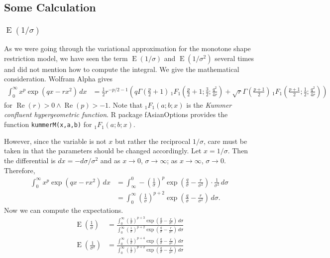 \documentclass[11pt]{article}
\newcommand{\opn}{\operatorname}
\begin{document}
\subsection{Some Calculation}
\subsubsection{$\opn{E}\left(1/\sigma\right)$}
As we were going through the variational approximation for the monotone shape restriction model, we have seen the term $\opn{E}\left(1/\sigma\right)$ and $\opn{E}\left(1/\sigma^{2}\right)$ several times and did not mention how to compute the integral. We give the mathematical consideration. Wolfram Alpha gives
\begin{align*}
  \int_{0}^{\infty}x^{p}\exp\left(qx-rx^{2}\right)\,dx &= \frac{1}{2}r^{-p/2 -1}\left(q\Gamma\left(\frac{p}{2}+1\right)\, _{1}{F}_{1}\left(\frac{p}{2}+1;\frac{3}{2};\frac{q^{2}}{4r}\right)+\sqrt{r}\Gamma\left(\frac{p+1}{2}\right)\, _{1}{F}_{1}\left(\frac{p+1}{2};\frac{1}{2};\frac{q^{2}}{4r}\right)\right)
\end{align*}
for $\opn{Re}\left(r\right)>0 \wedge \opn{Re}\left(p\right) > -1$. Note that $_{1}F_{1}\left(a;b;x\right)$ is the \emph{Kummer confluent hypergeometric function}. \textsf{R} package \textsf{fAsianOptions} provides the function \texttt{kummerM(x,a,b)} for $_{1}F_{1}\left(a;b;x\right)$. \par
However, since the variable is not $x$ but rather the reciprocal $1/\sigma$, care must be taken in that the parameters should be changed accordingly. Let $x=1/\sigma$. Then the differential is $dx = -d\sigma/\sigma^{2}$ and as $x\to 0$, $\sigma \to \infty$; as $x \to \infty$, $\sigma \to 0$. Therefore,
\begin{align*}
  \int_{0}^{\infty}x^{p}\exp\left(qx-rx^{2}\right)\,dx &= \int_{\infty}^{0} -\left(\frac{1}{\sigma}\right)^{p}\exp\left(\frac{q}{\sigma}-\frac{r}{\sigma^{2}}\right)\cdot \frac{1}{\sigma^{2}}\,d\sigma\\
  &= \int_{0}^{\infty} \left(\frac{1}{\sigma}\right)^{p+2}\exp\left(\frac{q}{\sigma}-\frac{r}{\sigma^{2}}\right)\,d\sigma.
\end{align*}
Now we can compute the expectations.
\begin{align*}
  \opn{E}\left(\frac{1}{\sigma}\right) &= \frac{\int_{0}^{\infty}\left(\frac{1}{\sigma}\right)^{p+3}\exp\left(\frac{q}{\sigma}-\frac{r}{\sigma^{2}}\right)\,d\sigma}{\int_{0}^{\infty} \left(\frac{1}{\sigma}\right)^{p+2}\exp\left(\frac{q}{\sigma}-\frac{r}{\sigma^{2}}\right)\,d\sigma}\\
  \opn{E}\left(\frac{1}{\sigma^{2}}\right) &= \frac{\int_{0}^{\infty}\left(\frac{1}{\sigma}\right)^{p+4}\exp\left(\frac{q}{\sigma}-\frac{r}{\sigma^{2}}\right)\,d\sigma}{\int_{0}^{\infty} \left(\frac{1}{\sigma}\right)^{p+2}\exp\left(\frac{q}{\sigma}-\frac{r}{\sigma^{2}}\right)\,d\sigma}
\end{align*}
\end{document}
